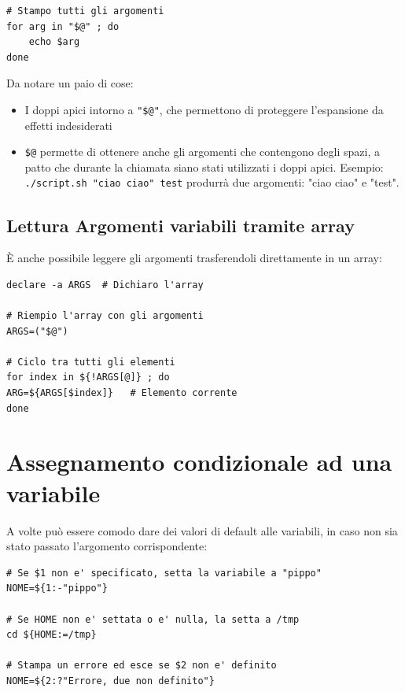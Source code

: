 \documentclass[a4paper]{report}
\newenvironment{info}{\begin{tcolorbox}[fonttitle=\sffamily\bfseries\large,title=Info,colframe=blue!75!white]}{\end{tcolorbox}}
\newenvironment{code}{\begin{tcolorbox}[size=small]}{\end{tcolorbox}}
\begin{document}
\begin{code}
\begin{lstlisting}
# Stampo tutti gli argomenti
for arg in "$@" ; do
	echo $arg
done
\end{lstlisting}
\end{code}

\begin{info}
Da notare un paio di cose:
\begin{itemize}
	\item I doppi apici intorno a \texttt{"\$@"}, che permettono di proteggere l'espansione da effetti indesiderati
	\item \texttt{\$@} permette di ottenere anche gli argomenti che contengono degli spazi, a patto che durante la chiamata siano stati utilizzati i doppi apici. Esempio: \texttt{./script.sh "ciao ciao" test} produrrà due argomenti: "ciao ciao" e "test".
\end{itemize}
\end{info}

\subsection{Lettura Argomenti variabili tramite array}

È anche possibile leggere gli argomenti trasferendoli direttamente in un array:

\begin{code}
\begin{lstlisting}
declare -a ARGS  # Dichiaro l'array

# Riempio l'array con gli argomenti
ARGS=("$@")

# Ciclo tra tutti gli elementi
for index in ${!ARGS[@]} ; do
ARG=${ARGS[$index]}   # Elemento corrente
done
\end{lstlisting}
\end{code}

\section{Assegnamento condizionale ad una variabile}
A volte può essere comodo dare dei valori di default alle variabili, in caso non sia stato passato l'argomento corrispondente:
\begin{code}
\begin{lstlisting}
# Se $1 non e' specificato, setta la variabile a "pippo"
NOME=${1:-"pippo"}

# Se HOME non e' settata o e' nulla, la setta a /tmp
cd ${HOME:=/tmp}

# Stampa un errore ed esce se $2 non e' definito
NOME=${2:?"Errore, due non definito"}
\end{lstlisting}
\end{code}
\end{document}
